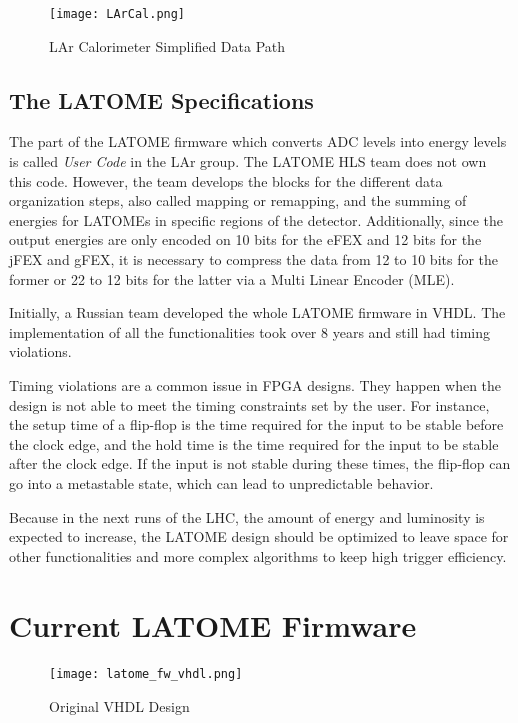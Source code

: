 \begin{figure}
    \centering
    \texttt{[image: LArCal.png]}
    \caption{LAr Calorimeter Simplified Data Path}
    \label{fig:lar-data-path}
\end{figure}

\subsection{The LATOME Specifications}\label{sec:latome-specifications}
The part of the LATOME firmware which converts ADC levels into energy levels is called \textit{User Code} in the LAr group. The LATOME HLS team does not own this code. However, the team develops the blocks for the different data organization steps, also called mapping or remapping, and the summing of energies for LATOMEs in specific regions of the detector. Additionally, since the output energies are only encoded on 10 bits for the eFEX and 12 bits for the jFEX and gFEX, it is necessary to compress the data from 12 to 10 bits for the former or 22 to 12 bits for the latter via a Multi Linear Encoder (MLE).

Initially, a Russian team developed the whole LATOME firmware in VHDL. The implementation of all the functionalities took over 8 years and still had timing violations. 

Timing violations are a common issue in FPGA designs. They happen when the design is not able to meet the timing constraints set by the user. For instance, the setup time of a flip-flop is the time required for the input to be stable before the clock edge, and the hold time is the time required for the input to be stable after the clock edge. If the input is not stable during these times, the flip-flop can go into a metastable state, which can lead to unpredictable behavior.

Because in the next runs of the LHC, the amount of energy and luminosity is expected to increase, the LATOME design should be optimized to leave space for other functionalities and more complex algorithms to keep high trigger efficiency.

\section{Current LATOME Firmware}\label{sec:existing-design}


\begin{figure}
    \centering
    \texttt{[image: latome\_fw\_vhdl.png]}
    \caption{Original VHDL Design}
    \label{fig:original-vhdl-design}
\end{figure}

